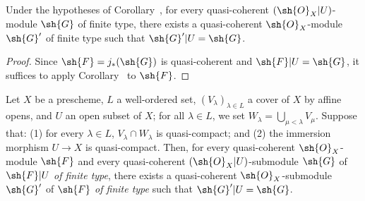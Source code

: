 \begin{corollary}[9.4.5]
\label{I.9.4.5}
Under the hypotheses of Corollary~, for every quasi-coherent $(\sh{O}_X|U)$-module
$\sh{G}$ of finite type, there exists a quasi-coherent $\sh{O}_X$-module $\sh{G}'$ of finite
type such that $\sh{G}'|U=\sh{G}$.
\end{corollary}

\begin{proof}
Since $\sh{F}=j_*(\sh{G})$ is quasi-coherent  and $\sh{F}|U=\sh{G}$, it
suffices to apply Corollary~ to $\sh{F}$.
\end{proof}

\begin{lemma}[9.4.6]
\label{I.9.4.6}
Let $X$ be a prescheme, $L$ a well-ordered set, $(V_\lambda)_{\lambda\in L}$ a cover of $X$
by affine opens, and $U$ an open subset of $X$; for all $\lambda\in L$, we set
$W_\lambda=\bigcup_{\mu<\lambda}V_\mu$. Suppose that: (1) for every $\lambda\in L$,
$V_\lambda\cap W_\lambda$ is quasi-compact; and (2) the immersion morphism $U\to X$ is
quasi-compact. Then, for every quasi-coherent $\sh{O}_X$-module $\sh{F}$ and every
quasi-coherent $(\sh{O}_X|U)$-submodule $\sh{G}$ of $\sh{F}|U$ \emph{of finite type}, there
exists a quasi-coherent $\sh{O}_X$-submodule $\sh{G}'$ of $\sh{F}$ \emph{of finite type} such
that $\sh{G}'|U=\sh{G}$.
\end{lemma}

